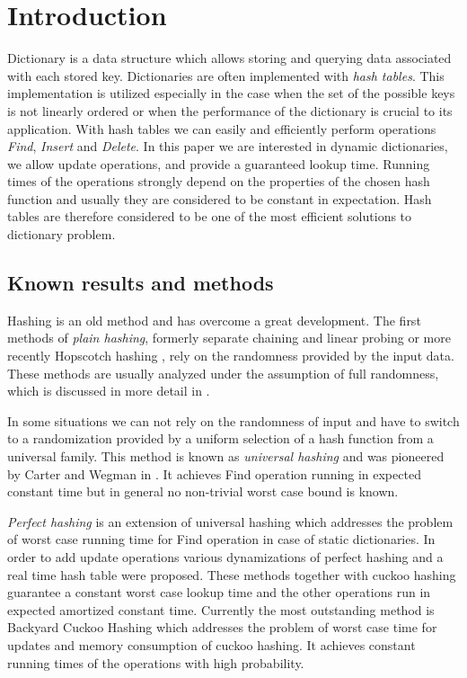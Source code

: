 \section{Introduction}
Dictionary is a data structure which allows storing and querying data associated with each stored key. 
Dictionaries are often implemented with \emph{hash tables}. 
This implementation is utilized especially in the case when the set of the possible keys is not linearly ordered or when the performance of the dictionary is crucial to its application.
With hash tables we can easily and efficiently perform operations \emph{Find}, \emph{Insert} and \emph{Delete}.
In this paper we are interested in dynamic dictionaries, we allow update operations, and provide a guaranteed lookup time.
Running times of the operations strongly depend on the properties of the chosen hash function and usually they are considered to be constant in expectation. 
Hash tables are therefore considered to be one of the most efficient solutions to dictionary problem.

\subsection{Known results and methods}
Hashing is an old method and has overcome a great development. 
The first methods of \emph{plain hashing}, formerly separate chaining and linear probing or more recently Hopscotch hashing \cite{DBLP:conf/wdag/HerlihyST08}, rely on the randomness provided by the input data. 
These methods are usually analyzed under the assumption of full randomness, which is discussed in more detail in \cite{DBLP:books/sp/Mehlhorn84}.

In some situations we can not rely on the randomness of input and have to switch to a randomization provided by a uniform selection of a hash function from a universal family. 
This method is known as \emph{universal hashing} and was pioneered by Carter and Wegman in \cite{DBLP:journals/jcss/CarterW79}.
It achieves Find operation running in expected constant time but in general no non-trivial worst case bound is known.

\emph{Perfect hashing} \cite{Fredman:1984:SST:828.1884} is an extension of universal hashing which addresses the problem of worst case running time for Find operation in case of static dictionaries. 
In order to add update operations various dynamizations of perfect hashing \cite{DBLP:journals/siamcomp/DietzfelbingerKMHRT94} and a real time hash table \cite{DBLP:conf/icalp/DietzfelbingerH90} were proposed. 
These methods together with cuckoo hashing \cite{DBLP:conf/esa/PaghR01} guarantee a constant worst case lookup time and the other operations run in expected amortized constant time.
Currently the most outstanding method is Backyard Cuckoo Hashing \cite{DBLP:conf/focs/ArbitmanNS10} which addresses the problem of worst case time for updates and memory consumption of cuckoo hashing.
It achieves constant running times of the operations with high probability.

